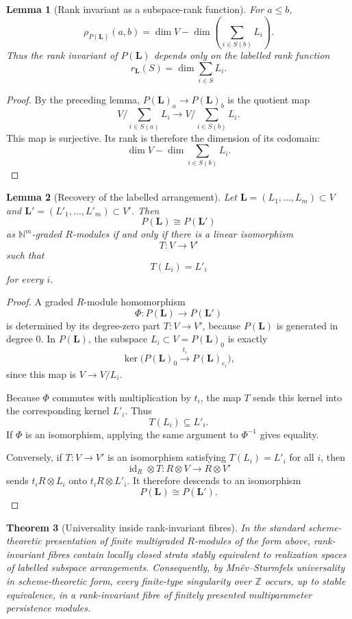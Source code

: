 \documentclass[11pt]{article}
\newtheorem{theorem}{Theorem}[section]
\newtheorem{lemma}[theorem]{Lemma}
\begin{document}
\begin{lemma}[Rank invariant as a subspace-rank function]
For \(a\leq b\),
\[
\rho_{P(\mathbf L)}(a,b)
=
\dim V-\dim\left(\sum_{i\in S(b)}L_i\right).
\]
Thus the rank invariant of \(P(\mathbf L)\) depends only on the labelled rank function
\[
r_\mathbf L(S)=\dim\sum_{i\in S}L_i.
\]
\end{lemma}

\begin{proof}
By the preceding lemma, \(P(\mathbf L)_a\to P(\mathbf L)_b\) is the quotient map
\[
V/\sum_{i\in S(a)}L_i
\longrightarrow
V/\sum_{i\in S(b)}L_i.
\]
This map is surjective. Its rank is therefore the dimension of its codomain:
\[
\dim V-\dim\sum_{i\in S(b)}L_i.
\]
\end{proof}

\begin{lemma}[Recovery of the labelled arrangement]
Let \(\mathbf L=(L_1,\ldots,L_m)\subset V\) and \(\mathbf L'=(L'_1,\ldots,L'_m)\subset V'\). Then
\[
P(\mathbf L)\cong P(\mathbf L')
\]
as \(\mathbb N^m\)-graded \(R\)-modules if and only if there is a linear isomorphism
\[
T:V\to V'
\]
such that
\[
T(L_i)=L'_i
\]
for every \(i\).
\end{lemma}

\begin{proof}
A graded \(R\)-module homomorphism
\[
\Phi:P(\mathbf L)\to P(\mathbf L')
\]
is determined by its degree-zero part \(T:V\to V'\), because \(P(\mathbf L)\) is generated in degree \(0\). In \(P(\mathbf L)\), the subspace \(L_i\subset V=P(\mathbf L)_0\) is exactly
\[
\ker\bigl(P(\mathbf L)_0\xrightarrow{t_i}P(\mathbf L)_{e_i}\bigr),
\]
since this map is \(V\to V/L_i\).

Because \(\Phi\) commutes with multiplication by \(t_i\), the map \(T\) sends this kernel into the corresponding kernel \(L'_i\). Thus
\[
T(L_i)\subseteq L'_i.
\]
If \(\Phi\) is an isomorphism, applying the same argument to \(\Phi^{-1}\) gives equality.

Conversely, if \(T:V\to V'\) is an isomorphism satisfying \(T(L_i)=L'_i\) for all \(i\), then
\[
\operatorname{id}_R\otimes T:R\otimes V\to R\otimes V'
\]
sends \(t_iR\otimes L_i\) onto \(t_iR\otimes L'_i\). It therefore descends to an isomorphism
\[
P(\mathbf L)\cong P(\mathbf L').
\]
\end{proof}

\begin{theorem}[Universality inside rank-invariant fibres]
In the standard scheme-theoretic presentation of finite multigraded \(R\)-modules of the form above, rank-invariant fibres contain locally closed strata stably equivalent to realization spaces of labelled subspace arrangements. Consequently, by Mnëv--Sturmfels universality in scheme-theoretic form, every finite-type singularity over \(\mathbb Z\) occurs, up to stable equivalence, in a rank-invariant fibre of finitely presented multiparameter persistence modules.
\end{theorem}
\end{document}
